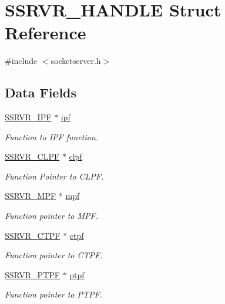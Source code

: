 \hypertarget{struct_s_s_r_v_r___h_a_n_d_l_e}{\section{S\-S\-R\-V\-R\-\_\-\-H\-A\-N\-D\-L\-E Struct Reference}
\label{struct_s_s_r_v_r___h_a_n_d_l_e}
}


{\ttfamily \#include $<$socketserver.\-h$>$}

\subsection*{Data Fields}
\begin{DoxyCompactItemize}
\item 
\hyperlink{socketserver_8h_a93d8d401108d91cfcd784619941ac535}{S\-S\-R\-V\-R\-\_\-\-I\-P\-F} $\ast$ \hyperlink{struct_s_s_r_v_r___h_a_n_d_l_e_a012af24eff075dda0e6bec0dbe686821}{ipf}
\begin{DoxyCompactList}\small\item\em Function to I\-P\-F function. \end{DoxyCompactList}\item 
\hyperlink{socketserver_8h_ae54a889b2c55c9138d924abef8f51d3b}{S\-S\-R\-V\-R\-\_\-\-C\-L\-P\-F} $\ast$ \hyperlink{struct_s_s_r_v_r___h_a_n_d_l_e_a34f592a823c507852003bb2c264ce03f}{clpf}
\begin{DoxyCompactList}\small\item\em Function Pointer to C\-L\-P\-F. \end{DoxyCompactList}\item 
\hyperlink{socketserver_8h_a4439dfce658b2313b3a6352eeb6f7e9c}{S\-S\-R\-V\-R\-\_\-\-M\-P\-F} $\ast$ \hyperlink{struct_s_s_r_v_r___h_a_n_d_l_e_a2f352051a7414981c048ef9ac094a4f0}{mpf}
\begin{DoxyCompactList}\small\item\em Function pointer to M\-P\-F. \end{DoxyCompactList}\item 
\hyperlink{socketserver_8h_a54951c949426b1745d6345943b763cf1}{S\-S\-R\-V\-R\-\_\-\-C\-T\-P\-F} $\ast$ \hyperlink{struct_s_s_r_v_r___h_a_n_d_l_e_ac67dbc58c3fe660c864609ada9042623}{ctpf}
\begin{DoxyCompactList}\small\item\em Function pointer to C\-T\-P\-F. \end{DoxyCompactList}\item 
\hyperlink{socketserver_8h_aba79a85fcc6b3f7f9e9a2a668309042d}{S\-S\-R\-V\-R\-\_\-\-P\-T\-P\-F} $\ast$ \hyperlink{struct_s_s_r_v_r___h_a_n_d_l_e_a13a63c2cf05342c600a759d3dfb237ee}{ptpf}
\begin{DoxyCompactList}\small\item\em Function pointer to P\-T\-P\-F. \end{DoxyCompactList}\end{DoxyCompactItemize}


